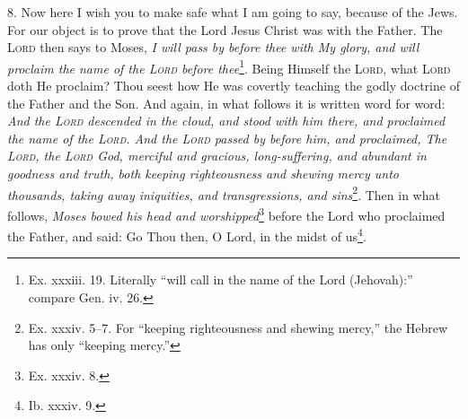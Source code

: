 8. Now here I wish you to make safe what I am going to say, because of the Jews. For our object is to prove that the Lord Jesus Christ was with the Father. The \textsc{Lord} then says to Moses, \emph{I will pass by before thee with My glory, and will proclaim the name of the \textsc{Lord} before thee}\footnote{Ex. xxxiii. 19. Literally “will call in the name of the Lord (Jehovah):” compare Gen. iv. 26.}. Being Himself the \textsc{Lord}, what \textsc{Lord} doth He proclaim? Thou seest how He was covertly teaching the godly doctrine of the Father and the Son. And again, in what follows it is written word for word: \emph{And the \textsc{Lord} descended in the cloud, and stood with him there, and proclaimed the name of the \textsc{Lord}. And the \textsc{Lord} passed by before him, and proclaimed, The \textsc{Lord}, the \textsc{Lord} God, merciful and gracious, long-suffering, and abundant in goodness and truth, both keeping righteousness and shewing mercy unto thousands, taking away iniquities, and transgressions, and sins}\footnote{Ex. xxxiv. 5–7. For “keeping righteousness and shewing mercy,” the Hebrew has only “keeping mercy.”}. Then in what follows, \emph{Moses bowed his head and worshipped}\footnote{Ex. xxxiv. 8.} before the Lord who proclaimed the Father, and said: Go Thou then, O Lord, in the midst of us\footnote{Ib. xxxiv. 9.}.

